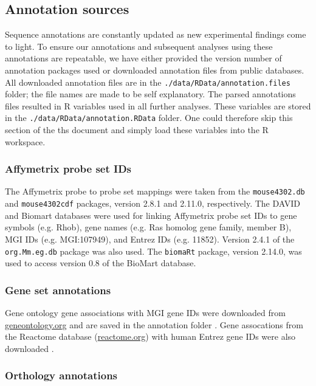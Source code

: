 \subsection{Annotation sources}
Sequence annotations are constantly updated as new experimental
findings come to light. To ensure our annotations and subsequent
analyses using these annotations are repeatable, 
we have either provided the
version number of annotation packages used or downloaded annotation files
from public databases. All downloaded annotation files are in the
\texttt{./data/RData/annotation.files} folder;
the file names are made to be self explanatory. The
parsed annotations files resulted in R variables used in all further analyses. These
variables are stored in the \texttt{./data/RData/annotation.RData} folder.
One could therefore skip this section of the ths document and simply load
these variables into the R workspace.

\subsubsection{Affymetrix probe set IDs}
The Affymetrix
probe to probe set mappings were taken from the 
\texttt{mouse4302.db} and \texttt{mouse4302cdf} packages, 
version 2\@.8\@.1 and 2\@.11\@.0, respectively. 
The DAVID \cite{Huang:2009uz} and 
Biomart \cite{Kasprzyk:2011ky}
databases were used for linking
Affymetrix probe set IDs to gene symbols (e\@.g\@. Rhob), 
gene names (e\@.g\@. Ras homolog gene family, member B),
MGI IDs (e\@.g\@. MGI:107949), and Entrez IDs (e\@.g\@. 11852).
Version 2\@.4\@.1 of the \texttt{org.Mm.eg.db} package was also used.
The \texttt{biomaRt} package, version 2\@.14\@.0, was used
to access version 0\@.8 of the BioMart database.

\subsubsection{Gene set annotations}

Gene ontology gene associations with MGI gene IDs 
were downloaded from \href{http://geneontology.org}{geneontology.org} and
are saved in the annotation folder \cite{Ashburner:2000ja}. Gene 
assocations from the Reactome
database (\href{http://www.reactome.org}{reactome.org}) with human Entrez gene IDs were 
also downloaded \cite{Matthews:2009kj}.

\subsubsection{Orthology annotations}

